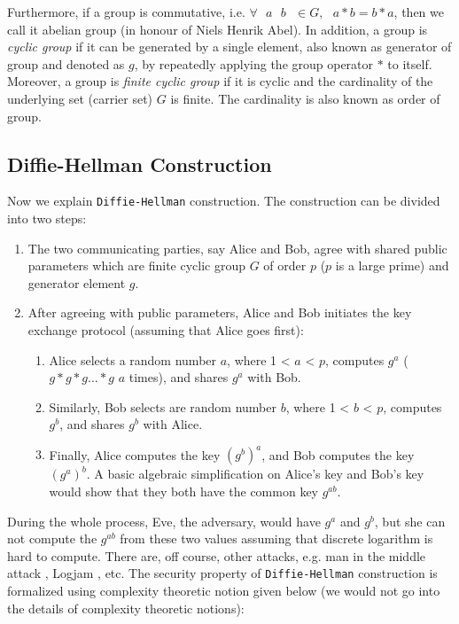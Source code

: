     \noindent
    Furthermore, if a group is commutative, i.e. 
    $\forall \text{  } a \text{  } b \text{  } \in  G,  \text{  } a * b = b * a$, then we call it abelian group (in honour of Niels Henrik Abel). In addition, 
    a group is \textit{cyclic group} if it can be generated by a single element, also known as generator of group 
    and denoted as $g$, by repeatedly applying the group operator $*$ to itself. Moreover, a group is \textit{finite cyclic group}
    if it is cyclic and the cardinality of the underlying set (carrier set) $G$ is finite. The cardinality is also known as order of group. 
	    
    
     
     \subsection{Diffie-Hellman Construction}
     \label{sec:diffie-hellman}
     	Now we explain \texttt{Diffie-Hellman} construction. The construction can be divided into two steps:
		\begin{enumerate}
		\item The two communicating parties, say Alice and Bob, agree with shared public parameters which 
		are finite cyclic group $G$ of order $p$ ($p$ is a large prime) and generator element $g$.
		\item After agreeing with public parameters, Alice and Bob initiates the key exchange protocol (assuming that 
		 Alice goes first):
		 \begin{enumerate}
		   \item Alice selects a random number $a$, where 1 < $a$ < $p$, computes $g^{a}$ ( $g * g * g ... * g$  $a$ times), and shares 
		   $g^{a}$ with Bob. 
		   \item Similarly, Bob selects are random number $b$, where 1 < $b$ < $p$, computes $g^{b}$, and shares  $g^{b}$
		   with Alice.
		   \item Finally, Alice computes the key $(g^{b})^{a}$, and Bob computes the key $(g^{a})^{b}$.  A basic 
		   algebraic simplification on Alice's key and Bob's key would show that they both have the 
		   common key  $g^{ab}$.
		   
		 \end{enumerate}
      \end{enumerate}		
      
     
      \noindent
       During the whole process, Eve, the adversary, would have $g^{a}$ and $g^{b}$, but she can not compute the 
      $ g^{ab}$ from these two values assuming that discrete logarithm is hard to compute. 
      There are, off course, other attacks, e.g.  man in the middle attack \citep{menezes2018handbook}, Logjam \citep{Adrian:2015:IFS:2810103.2813707}, etc. 
      The security property of \texttt{Diffie-Hellman} construction is formalized using complexity theoretic notion 
      given below (we would not go into the details of complexity theoretic notions):
      
